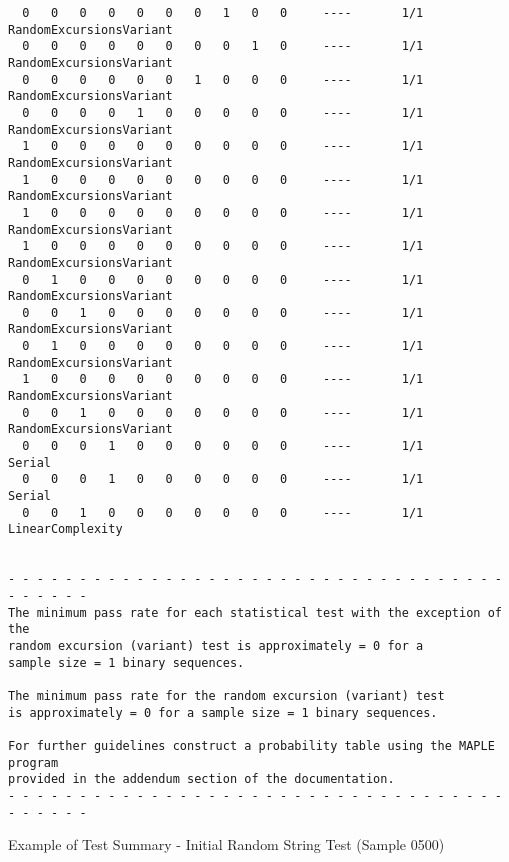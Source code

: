 \begin{code}
\begin{verbatim}
  0   0   0   0   0   0   0   1   0   0     ----       1/1       RandomExcursionsVariant
  0   0   0   0   0   0   0   0   1   0     ----       1/1       RandomExcursionsVariant
  0   0   0   0   0   0   1   0   0   0     ----       1/1       RandomExcursionsVariant
  0   0   0   0   1   0   0   0   0   0     ----       1/1       RandomExcursionsVariant
  1   0   0   0   0   0   0   0   0   0     ----       1/1       RandomExcursionsVariant
  1   0   0   0   0   0   0   0   0   0     ----       1/1       RandomExcursionsVariant
  1   0   0   0   0   0   0   0   0   0     ----       1/1       RandomExcursionsVariant
  1   0   0   0   0   0   0   0   0   0     ----       1/1       RandomExcursionsVariant
  0   1   0   0   0   0   0   0   0   0     ----       1/1       RandomExcursionsVariant
  0   0   1   0   0   0   0   0   0   0     ----       1/1       RandomExcursionsVariant
  0   1   0   0   0   0   0   0   0   0     ----       1/1       RandomExcursionsVariant
  1   0   0   0   0   0   0   0   0   0     ----       1/1       RandomExcursionsVariant
  0   0   1   0   0   0   0   0   0   0     ----       1/1       RandomExcursionsVariant
  0   0   0   1   0   0   0   0   0   0     ----       1/1       Serial
  0   0   0   1   0   0   0   0   0   0     ----       1/1       Serial
  0   0   1   0   0   0   0   0   0   0     ----       1/1       LinearComplexity


- - - - - - - - - - - - - - - - - - - - - - - - - - - - - - - - - - - - - - - - -
The minimum pass rate for each statistical test with the exception of the
random excursion (variant) test is approximately = 0 for a
sample size = 1 binary sequences.

The minimum pass rate for the random excursion (variant) test
is approximately = 0 for a sample size = 1 binary sequences.

For further guidelines construct a probability table using the MAPLE program
provided in the addendum section of the documentation.
- - - - - - - - - - - - - - - - - - - - - - - - - - - - - - - - - - - - - - - - -
    \end{verbatim}
    \caption{Example of Test Summary - Initial Random String Test (Sample 0500)}
    \label{lst:samp_nist_sum}
\end{code}